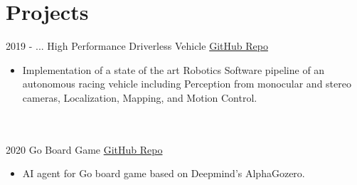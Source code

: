 \documentclass[letterpaper]{twentysecondcv} %
\begin{document}
\section{Projects }{\faClipboard}
\begin{twenty}
	    \twentyitem
   		{2019 - ...}
		{}
        {High Performance Driverless Vehicle}
        {\href{https://github.com/curtfs/CURT-FSAI/}{GitHub Repo}}
        {}
        {\vspace{-2mm}\begin{itemize}[topsep=0pt,partopsep=0pt]
				\item  Implementation of a state of the art Robotics Software pipeline of an autonomous racing vehicle including Perception from monocular and stereo cameras, Localization, Mapping, and Motion Control.
       
    \end{itemize}} \\\\
			
	    \twentyitem
   		{2020}
		{}
        {Go Board Game}
        {\href{https://github.com/JoGo20/Implementation/}{GitHub Repo}}
        {}
        {\vspace{-2mm}\begin{itemize}[topsep=0pt,partopsep=0pt]
				\item  AI agent for Go board game based on Deepmind's AlphaGozero.
       
    \end{itemize}} \\\\
		

	
		
	
\end{twenty}
\end{document}
